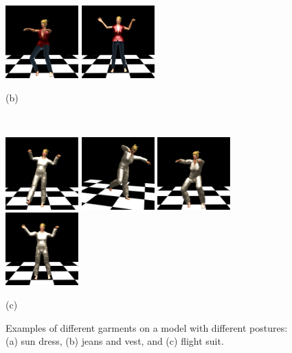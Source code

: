 \begin{figure}[htbp]
{	\includegraphics[width=0.250\textwidth]{./figures/jeans-3.eps}
	\includegraphics[width=0.250\textwidth]{./figures/jeans-4.eps}
	}
	\centerline{(b)}
	\centerline{\ }
	\centerline{
	\includegraphics[width=0.250\textwidth]{./figures/flightsuit-1.eps}
	\includegraphics[width=0.250\textwidth]{./figures/flightsuit-2.eps}
	\includegraphics[width=0.250\textwidth]{./figures/flightsuit-3.eps}
	\includegraphics[width=0.250\textwidth]{./figures/flightsuit-4.eps}
	}
	\centerline{(c)}
	\caption{Examples of different garments on a model with different postures: (a) sun dress, (b) jeans and vest, and 	(c) flight suit.}
	\label{fig:examples}
\end{figure}


